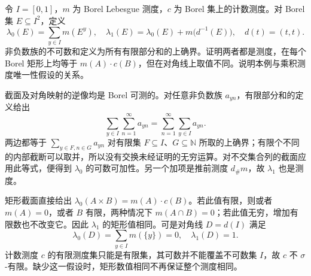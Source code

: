 \begin{optionalexercise}\label{b1:ex:07-nonsigma-uniqueness}
令 \(I=[0,1]\)，\(m\) 为 Borel Lebesgue 测度，\(c\) 为 Borel 集上的计数测度。对 Borel 集 \(E\subseteq I^2\)，定义
\[
\lambda_0(E)=\sum_{y\in I}m(E^y),
\quad
\lambda_1(E)=\lambda_0(E)+m\bigl(d^{-1}(E)\bigr),\quad d(t)=(t,t).
\]
非负数族的不可数和定义为所有有限部分和的上确界。证明两者都是测度，在每个 Borel 矩形上均等于 \(m(A)\cdot c(B)\)，但在对角线上取值不同。说明本例与乘积测度唯一性假设的关系。
\end{optionalexercise}
\begin{solution}
截面及对角映射的逆像均是 Borel 可测的。对任意非负数族 \(a_{yn}\)，有限部分和的定义给出
\[
\sum_{y\in I}\sum_{n=1}^\infty a_{yn}
=\sum_{n=1}^\infty\sum_{y\in I}a_{yn}.
\]
两边都等于 \(\sum_{y\in F,n\in G}a_{yn}\) 对有限集 \(F\subseteq I\)、\(G\subseteq\mathbb N\) 所取的上确界；有限个不同的内部截断可以取并，所以没有交换未经证明的无穷运算。对不交集合列的截面应用此等式，便得到 \(\lambda_0\) 的可数可加性。另一个加项是推前测度 \(d_\#m\)，故 \(\lambda_1\) 也是测度。

矩形截面直接给出 \(\lambda_0(A\times B)=m(A)\cdot c(B)\)。若此值有限，则或者 \(m(A)=0\)，或者 \(B\) 有限，两种情况下 \(m(A\cap B)=0\)；若此值无穷，增加有限数也不改变它。因此 \(\lambda_1\) 的矩形值相同。可是对角线 \(D=d(I)\) 满足
\[
\lambda_0(D)=\sum_{y\in I}m(\{y\})=0,\quad
\lambda_1(D)=1.
\]
计数测度 \(c\) 的有限测度集只能是有限集，其可数并不能覆盖不可数集 \(I\)，故 \(c\) 不 \(\sigma\)-有限。缺少这一假设时，矩形数值相同不再保证整个测度相同。
\end{solution}
